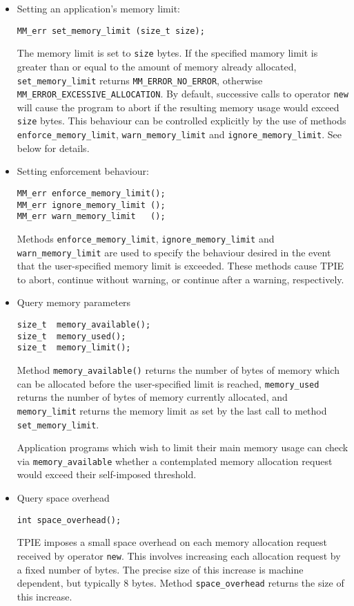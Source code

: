 \begin{itemize}
\item Setting an application's memory limit:
\begin{verbatim}
MM_err set_memory_limit (size_t size);
\end{verbatim}

The memory limit is set to \verb|size| bytes. If the
specified mamory limit is greater than or equal to the
amount of memory already allocated, \verb|set_memory_limit|
returns \verb|MM_ERROR_NO_ERROR|, otherwise
\verb|MM_ERROR_EXCESSIVE_ALLOCATION|. By default, successive
calls to operator \verb|new| will cause the program to abort
if the resulting memory usage would exceed \verb|size|
bytes. This behaviour can be controlled explicitly by the
use of methods \verb|enforce_memory_limit|,
\verb|warn_memory_limit| and \verb|ignore_memory_limit|.
See below for details.

\item Setting enforcement behaviour:
\begin{verbatim}
MM_err enforce_memory_limit();
MM_err ignore_memory_limit ();
MM_err warn_memory_limit   ();
\end{verbatim}

Methods \verb|enforce_memory_limit|,
\verb|ignore_memory_limit| and \verb|warn_memory_limit| are
used to specify the behaviour desired in the event that the
user-specified memory limit is exceeded. These methods cause
TPIE to abort, continue without warning, or continue after a
warning, respectively.

\item Query memory parameters

\begin{verbatim}
size_t  memory_available();
size_t  memory_used();
size_t  memory_limit();
\end{verbatim}

Method \verb|memory_available()| returns the number of bytes
of memory which can be allocated before the user-specified
limit is reached, \verb|memory_used| returns the number of
bytes of memory currently allocated, and \verb|memory_limit|
returns the memory limit as set by the last call to method
\verb|set_memory_limit|.

Application programs which wish to limit their main memory
usage can check via \verb|memory_available| whether a
contemplated memory allocation request would exceed their
self-imposed threshold.

\item Query space overhead

\begin{verbatim}
int space_overhead();
\end{verbatim}

TPIE imposes a small space overhead on each memory
allocation request received by operator \verb|new|. This involves
increasing each allocation request by a fixed number of
bytes. The precise size of this increase is machine
dependent, but typically 8 bytes. Method \verb|space_overhead|
returns the size of this increase.
\end{itemize}


